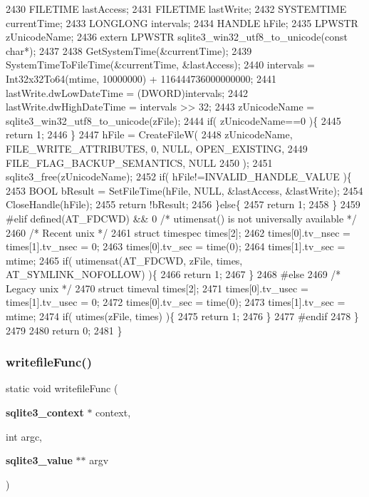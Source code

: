 \begin{DoxyCode}
2430     FILETIME lastAccess;
2431     FILETIME lastWrite;
2432     SYSTEMTIME currentTime;
2433     LONGLONG intervals;
2434     HANDLE hFile;
2435     LPWSTR zUnicodeName;
2436     \textcolor{keyword}{extern} LPWSTR sqlite3\_win32\_utf8\_to\_unicode(\textcolor{keyword}{const} \textcolor{keywordtype}{char}*);
2437 
2438     GetSystemTime(&currentTime);
2439     SystemTimeToFileTime(&currentTime, &lastAccess);
2440     intervals = Int32x32To64(mtime, 10000000) + 116444736000000000;
2441     lastWrite.dwLowDateTime = (DWORD)intervals;
2442     lastWrite.dwHighDateTime = intervals >> 32;
2443     zUnicodeName = sqlite3\_win32\_utf8\_to\_unicode(zFile);
2444     \textcolor{keywordflow}{if}( zUnicodeName==0 )\{
2445       \textcolor{keywordflow}{return} 1;
2446     \}
2447     hFile = CreateFileW(
2448       zUnicodeName, FILE\_WRITE\_ATTRIBUTES, 0, NULL, OPEN\_EXISTING,
2449       FILE\_FLAG\_BACKUP\_SEMANTICS, NULL
2450     );
2451     sqlite3_free(zUnicodeName);
2452     \textcolor{keywordflow}{if}( hFile!=INVALID\_HANDLE\_VALUE )\{
2453       BOOL bResult = SetFileTime(hFile, NULL, &lastAccess, &lastWrite);
2454       CloseHandle(hFile);
2455       \textcolor{keywordflow}{return} !bResult;
2456     \}\textcolor{keywordflow}{else}\{
2457       \textcolor{keywordflow}{return} 1;
2458     \}
2459 \textcolor{preprocessor}{#elif defined(AT\_FDCWD) && 0 }\textcolor{comment}{/* utimensat() is not universally available */}\textcolor{preprocessor}{}
2460     \textcolor{comment}{/* Recent unix */}
2461     \textcolor{keyword}{struct }timespec times[2];
2462     times[0].tv\_nsec = times[1].tv\_nsec = 0;
2463     times[0].tv\_sec = time(0);
2464     times[1].tv\_sec = mtime;
2465     \textcolor{keywordflow}{if}( utimensat(AT\_FDCWD, zFile, times, AT\_SYMLINK\_NOFOLLOW) )\{
2466       \textcolor{keywordflow}{return} 1;
2467     \}
2468 \textcolor{preprocessor}{#else}
2469     \textcolor{comment}{/* Legacy unix */}
2470     \textcolor{keyword}{struct }timeval times[2];
2471     times[0].tv\_usec = times[1].tv\_usec = 0;
2472     times[0].tv\_sec = time(0);
2473     times[1].tv\_sec = mtime;
2474     \textcolor{keywordflow}{if}( utimes(zFile, times) )\{
2475       \textcolor{keywordflow}{return} 1;
2476     \}
2477 \textcolor{preprocessor}{#endif}
2478   \}
2479 
2480   \textcolor{keywordflow}{return} 0;
2481 \}
\end{DoxyCode}
\mbox{\label{shell_8c_a11e5af10ab390682cf8fce9a534da02c}} 
\subsubsection{writefile\+Func()}
{\footnotesize\ttfamily static void writefile\+Func (\begin{DoxyParamCaption}\item[{\textbf{ sqlite3\+\_\+context} $\ast$}]{context,  }\item[{int}]{argc,  }\item[{\textbf{ sqlite3\+\_\+value} $\ast$$\ast$}]{argv }\end{DoxyParamCaption})\hspace{0.3cm}{\ttfamily [static]}}




